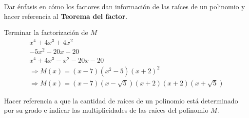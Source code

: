 {    Dar énfasis en cómo los factores dan información de las raíces de un polinomio y hacer referencia al \textbf{Teorema del factor}.

    Terminar la factorización de $M$
    \begin{align*}
        x^4 + 4x^3 + 4x^2\hspace{5em}\\
        -5x^2 - 20x - 20\\
        x^4 + 4x^3 - x^2 - 20x - 20\\
        \Rightarrow M(x) = (x - 7)(x^2 - 5)(x + 2)^2\\
        \Rightarrow M(x) = (x - 7)(x - \sqrt{5})(x + 2)(x + 2)(x + \sqrt{5})
    \end{align*}

    Hacer referencia a que la cantidad de raíces de un polinomio está determinado por su grado e indicar las multiplicidades de las raíces del polinomio $M$.
}\label{sec:clase-02}